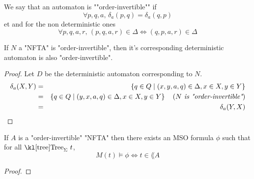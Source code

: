 \documentclass{article}
\begin{document}
\begin{definition}
	We say that an automaton is ""order-invertible"" if
	$$ \forall p,q,a,\, \delta_a (p,q) = \delta_a (q,p) $$ et
	and for the non deterministic ones
	$$ \forall p,q,a,r,\, (p,q,a,r) \in \Delta \iff  (q,p,a,r) \in \Delta $$

\end{definition}


\begin{lemma}
	If $N$ a "NFTA" is "order-invertible", then it's corresponding deterministic automaton is also "order-invertible".
\end{lemma}

\begin{proof}
	Let $D$ be the deterministic automaton corresponding to $N$.
	\begin{eqnarray*}
		\delta_a (X,Y) &=& \left\{q \in Q \mid (x,y,a,q) \in \Delta, x \in X, y \in Y\right\} \\
		&=& \left\{q \in Q \mid (y,x,a,q) \in \Delta, x \in X, y \in Y\right\}  \quad\left(\textit{$N$ is "order-invertible"}\right) \\
		&=& \delta_a (Y,X)
	\end{eqnarray*}
\end{proof}

\begin{theorem}
	If $A$ is a "order-invertible" "NFTA"  then there exists an MSO formula $\phi$ such that for all $\tree_{\Sigma} \ t$,
	$$ M(t) \models \phi \iff t \in \lang A$$
\end{theorem}

\begin{proof}
	\todo {}

\end{proof}





\end{document}

